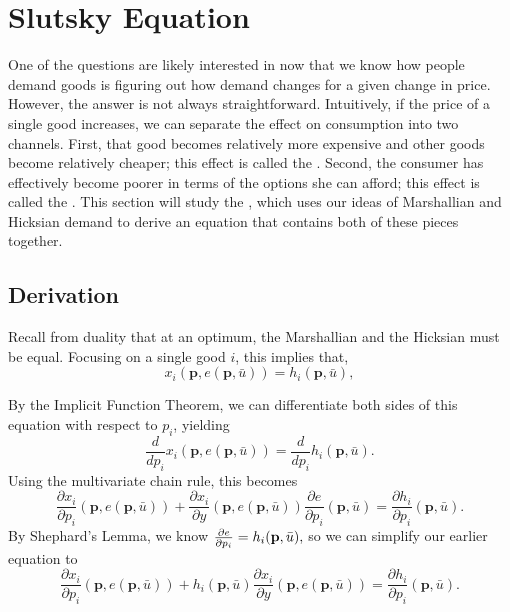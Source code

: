 \section{Slutsky Equation} 
One of the questions are likely interested in now that we know how people demand goods is figuring out how demand changes for a given change in price. However, the answer is not always straightforward. Intuitively, if the price of a single good increases, we can separate the effect on consumption into two channels. First, that good becomes relatively more expensive and other goods become relatively cheaper; this effect is called the . Second, the consumer has effectively become poorer in terms of the options she can afford; this effect is called the . This section will study the , which uses our ideas of Marshallian and Hicksian demand to derive an equation that contains both of these pieces together.

\subsection*{Derivation}
Recall from duality that at an optimum, the Marshallian and the Hicksian must be equal. Focusing on a single good $i$, this implies that, 
$$x_{i}(\mathbf{p}, e(\mathbf{p}, \bar{u}))=h_{i}(\mathbf{p}, \bar{u}),$$

By the Implicit Function Theorem, we can differentiate both sides of this equation with respect to $p_i$, yielding 
$$\frac{d}{d p_{i}} x_{i}(\mathbf{p}, e(\mathbf{p}, \bar{u}))=\frac{d}{d p_{i}} h_{i}(\mathbf{p}, \bar{u}).$$
Using the multivariate chain rule, this becomes 
$$\frac{\partial x_{i}}{\partial p_{i}}(\mathbf{p}, e(\mathbf{p}, \bar{u}))+\frac{\partial x_{i}}{\partial y}(\mathbf{p}, e(\mathbf{p}, \bar{u})) \frac{\partial e}{\partial p_{i}}(\mathbf{p}, \bar{u})=\frac{\partial h_{i}}{\partial p_{i}}(\mathbf{p}, \bar{u}).$$
By Shephard's Lemma, we know $\pdv{e}{p_i}(\mathbf{p}, \bar{u})=h_{i}(\mathbf{p}, \bar{u}),$ so we can simplify our earlier equation to 
$$\frac{\partial x_{i}}{\partial p_{i}}(\mathbf{p}, e(\mathbf{p}, \bar{u}))+h_{i}(\mathbf{p}, \bar{u}) \frac{\partial x_{i}}{\partial y}(\mathbf{p}, e(\mathbf{p}, \bar{u}))=\frac{\partial h_{i}}{\partial p_{i}}(\mathbf{p}, \bar{u}).$$

